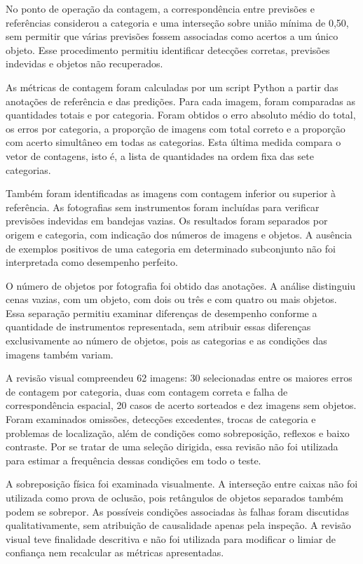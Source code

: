 No ponto de operação da contagem, a correspondência entre previsões e referências considerou a categoria e uma interseção sobre união mínima de 0,50, sem permitir que várias previsões fossem associadas como acertos a um único objeto. Esse procedimento permitiu identificar detecções corretas, previsões indevidas e objetos não recuperados.

As métricas de contagem foram calculadas por um script Python a partir das anotações de referência e das predições. Para cada imagem, foram comparadas as quantidades totais e por categoria. Foram obtidos o erro absoluto médio do total, os erros por categoria, a proporção de imagens com total correto e a proporção com acerto simultâneo em todas as categorias. Esta última medida compara o vetor de contagens, isto é, a lista de quantidades na ordem fixa das sete categorias.

Também foram identificadas as imagens com contagem inferior ou superior à referência. As fotografias sem instrumentos foram incluídas para verificar previsões indevidas em bandejas vazias. Os resultados foram separados por origem e categoria, com indicação dos números de imagens e objetos. A ausência de exemplos positivos de uma categoria em determinado subconjunto não foi interpretada como desempenho perfeito.

O número de objetos por fotografia foi obtido das anotações. A análise distinguiu cenas vazias, com um objeto, com dois ou três e com quatro ou mais objetos. Essa separação permitiu examinar diferenças de desempenho conforme a quantidade de instrumentos representada, sem atribuir essas diferenças exclusivamente ao número de objetos, pois as categorias e as condições das imagens também variam.

A revisão visual compreendeu 62 imagens: 30 selecionadas entre os maiores erros de contagem por categoria, duas com contagem correta e falha de correspondência espacial, 20 casos de acerto sorteados e dez imagens sem objetos. Foram examinados omissões, detecções excedentes, trocas de categoria e problemas de localização, além de condições como sobreposição, reflexos e baixo contraste. Por se tratar de uma seleção dirigida, essa revisão não foi utilizada para estimar a frequência dessas condições em todo o teste.

A sobreposição física foi examinada visualmente. A interseção entre caixas não foi utilizada como prova de oclusão, pois retângulos de objetos separados também podem se sobrepor. As possíveis condições associadas às falhas foram discutidas qualitativamente, sem atribuição de causalidade apenas pela inspeção. A revisão visual teve finalidade descritiva e não foi utilizada para modificar o limiar de confiança nem recalcular as métricas apresentadas.


